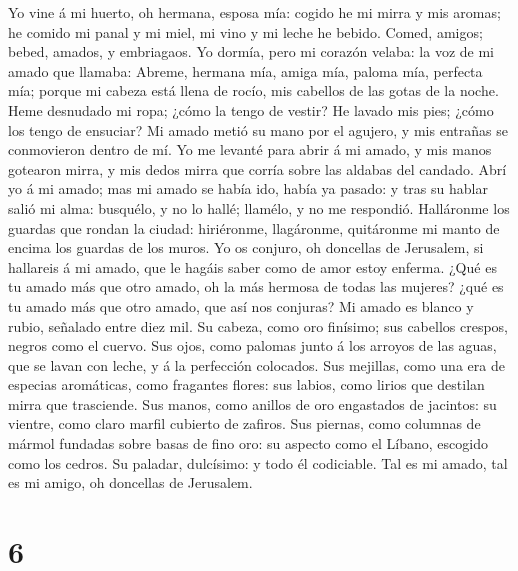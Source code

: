  Yo vine á mi huerto, oh hermana, esposa mía: cogido he mi
mirra y mis aromas; he comido mi panal y mi miel, mi vino y mi leche he
bebido. Comed, amigos; bebed, amados, y embriagaos.  Yo
dormía, pero mi corazón velaba: la voz de mi amado que llamaba: Abreme,
hermana mía, amiga mía, paloma mía, perfecta mía; porque mi cabeza está
llena de rocío, mis cabellos de las gotas de la noche.  Heme
desnudado mi ropa; ¿cómo la tengo de vestir? He lavado mis pies; ¿cómo
los tengo de ensuciar?  Mi amado metió su mano por el
agujero, y mis entrañas se conmovieron dentro de mí.  Yo me
levanté para abrir á mi amado, y mis manos gotearon mirra, y mis dedos
mirra que corría sobre las aldabas del candado.  Abrí yo á
mi amado; mas mi amado se había ido, había ya pasado: y tras su hablar
salió mi alma: busquélo, y no lo hallé; llamélo, y no me respondió.
 Halláronme los guardas que rondan la ciudad: hiriéronme,
llagáronme, quitáronme mi manto de encima los guardas de los muros.
 Yo os conjuro, oh doncellas de Jerusalem, si hallareis á mi
amado, que le hagáis saber como de amor estoy enferma.  ¿Qué
es tu amado más que otro amado, oh la más hermosa de todas las mujeres?
¿qué es tu amado más que otro amado, que así nos conjuras? 
Mi amado es blanco y rubio, señalado entre diez mil.  Su
cabeza, como oro finísimo; sus cabellos crespos, negros como el cuervo.
 Sus ojos, como palomas junto á los arroyos de las aguas,
que se lavan con leche, y á la perfección colocados.  Sus
mejillas, como una era de especias aromáticas, como fragantes flores:
sus labios, como lirios que destilan mirra que trasciende. 
Sus manos, como anillos de oro engastados de jacintos: su vientre, como
claro marfil cubierto de zafiros.  Sus piernas, como
columnas de mármol fundadas sobre basas de fino oro: su aspecto como el
Líbano, escogido como los cedros.  Su paladar, dulcísimo: y
todo él codiciable. Tal es mi amado, tal es mi amigo, oh doncellas de
Jerusalem.

\hypertarget{section-5}{%
\section{6}\label{section-5}}

